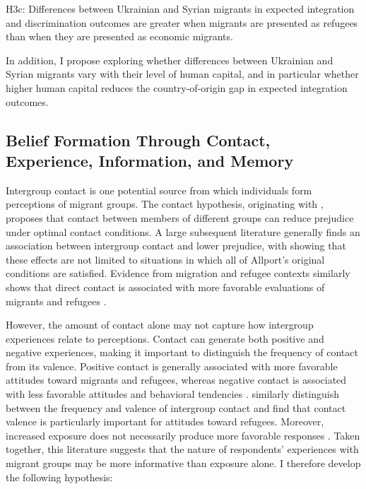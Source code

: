 H3c: Differences between Ukrainian and Syrian migrants in expected integration and discrimination outcomes are greater
when migrants are presented as refugees than when they are presented as economic migrants.\bigskip

In addition, I propose exploring whether differences between Ukrainian and Syrian migrants vary with their level of human capital, 
and in particular whether higher human capital reduces the country-of-origin gap in expected integration outcomes.

\subsection{Belief Formation Through Contact, Experience, Information, and Memory}

Intergroup contact is one potential source from which individuals form perceptions of migrant groups.
The contact hypothesis, originating with \citet{allport1954nature}, proposes that contact between members of different 
groups can reduce prejudice under optimal contact conditions. A large subsequent literature generally finds an 
association between intergroup contact and lower prejudice, with \citet{pettigrew2006meta} showing that these effects are
not limited to situations in which all of Allport’s original conditions are satisfied.
Evidence from migration and refugee contexts similarly shows that direct contact is associated with more 
favorable evaluations of migrants and refugees \citep{kotzur2019meeting, de2021contact, khalil2022does}.

However, the amount of contact alone may not capture how intergroup experiences relate to perceptions.
Contact can generate both positive and negative experiences, making it important to distinguish the frequency 
of contact from its valence. Positive contact is generally associated with more favorable attitudes toward migrants and 
refugees, whereas negative contact is associated with less favorable attitudes and behavioral tendencies 
\citep{laurence2018countervailing, kotzur2019meeting, bagci2023dealing}. \citet{de2021contact} similarly distinguish 
between the frequency and valence of intergroup contact and find that contact valence is particularly important for 
attitudes toward refugees. Moreover, increased exposure does not necessarily produce more favorable responses 
\citep{enos2019causal, hangartner2019does}. Taken together, this literature suggests that the nature of respondents’ 
experiences with migrant groups may be more informative than exposure alone. I therefore develop the following 
hypothesis: \bigskip

